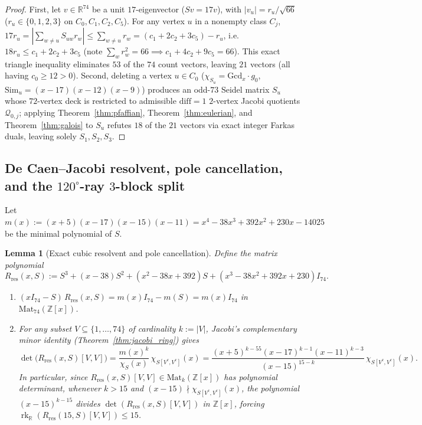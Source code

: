 \documentclass[11pt,reqno]{amsart}
\newtheorem{lemma}[theorem]{Lemma}
\theoremstyle{definition}
\theoremstyle{remark}
\numberwithin{equation}{section}
\numberwithin{table}{section}
\DeclareMathOperator{\rk}{rk}
\begin{document}
\begin{proof}
First, let $v \in \mathbb{R}^{74}$ be a unit $17$-eigenvector ($Sv = 17v$), with $|v_u| = r_u / \sqrt{66}$ ($r_u \in \{0, 1, 2, 3\}$ on $C_0, C_1, C_2, C_5$). For any vertex $u$ in a nonempty class $C_j$, $17 r_u = |\sum_{w \neq u} S_{uw} r_w| \le \sum_{w \neq u} r_w = (c_1 + 2c_2 + 3c_5) - r_u$, i.e.\ $18 r_u \le c_1 + 2c_2 + 3c_5$ (note $\sum_w r_w^2 = 66 \implies c_1 + 4c_2 + 9c_5 = 66$). This exact triangle inequality eliminates $53$ of the $74$ count vectors, leaving $21$ vectors (all having $c_0 \ge 12 > 0$). Second, deleting a vertex $u \in C_0$ ($\chi_{S_u} = \mathrm{Gcd}_x \cdot g_0$, $\mathrm{Sim}_u = (x-17)(x-12)(x-9)$) produces an odd-$73$ Seidel matrix $S_u$ whose $72$-vertex deck is restricted to admissible $\mathrm{diff}=1$ $2$-vertex Jacobi quotients $\mathcal{Q}_{0,j}$; applying Theorem~\ref{thm:pfaffian}, Theorem~\ref{thm:eulerian}, and Theorem~\ref{thm:galois} to $S_u$ refutes $18$ of the $21$ vectors via exact integer Farkas duals, leaving solely $S_1, S_2, S_3$.
\end{proof}

\subsection{De Caen--Jacobi resolvent, pole cancellation, and the \texorpdfstring{$120^\circ$-ray $3$-block}{120-degree-ray 3-block} split}
Let $m(x) := (x + 5)(x - 17)(x - 15)(x - 11) = x^4 - 38x^3 + 392x^2 + 230x - 14025$ be the minimal polynomial of $S$.

\begin{lemma}[Exact cubic resolvent and pole cancellation]\label{lem:resolvent_pole}
Define the matrix polynomial
\[
  R_{\mathrm{res}}(x, S) := S^3 + (x - 38)S^2 + (x^2 - 38x + 392)S + (x^3 - 38x^2 + 392x + 230)I_{74}.
\]
\begin{enumerate}
  \item $(xI_{74} - S)\,R_{\mathrm{res}}(x, S) = m(x)I_{74} - m(S) = m(x)I_{74}$ in $\mathrm{Mat}_{74}(\mathbb{Z}[x])$.
  \item For any subset $V \subseteq \{1, \dots, 74\}$ of cardinality $k := |V|$, Jacobi's complementary minor identity (Theorem~\ref{thm:jacobi_ring}) gives
  \begin{equation}\label{eq:idx13_complementary}
    \det\!\big(R_{\mathrm{res}}(x, S)[V, V]\big) = \frac{m(x)^k}{\chi_S(x)}\,\chi_{S[V^c, V^c]}(x)
    = \frac{(x+5)^{k-55}(x-17)^{k-1}(x-11)^{k-3}}{(x-15)^{15 - k}}\,\chi_{S[V^c, V^c]}(x).
  \end{equation}
  In particular, since $R_{\mathrm{res}}(x, S)[V, V] \in \mathrm{Mat}_k(\mathbb{Z}[x])$ has polynomial determinant, whenever $k > 15$ and $(x - 15) \nmid \chi_{S[V^c, V^c]}(x)$, the polynomial $(x - 15)^{k - 15}$ divides $\det(R_{\mathrm{res}}(x, S)[V, V])$ in $\mathbb{Z}[x]$, forcing $\rk_{\mathbb{R}}(R_{\mathrm{res}}(15, S)[V, V]) \le 15$.
\end{enumerate}
\end{lemma}
\end{document}
